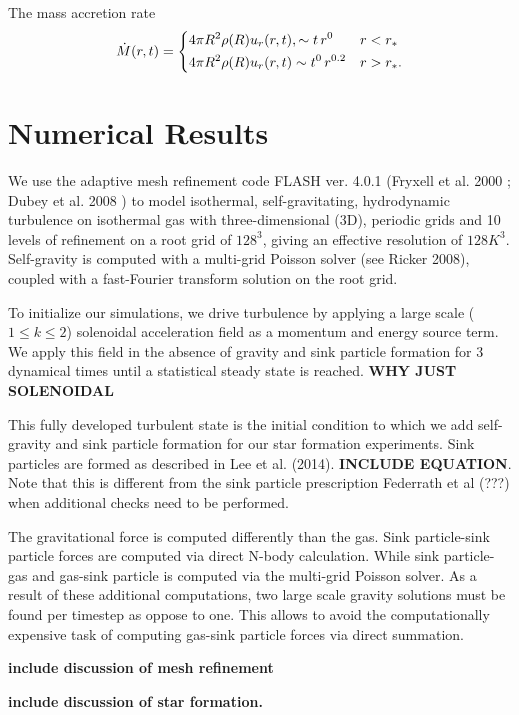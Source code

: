 \documentclass{emulateapj}
\newcommand{\be}{\begin{equation}}
\newcommand{\ee}{\end{equation}}
\begin{document}
The mass accretion rate 
%
\be
\dot M(r,t)=
\begin{dcases}
4\pi R^2\rho(R)u_r(r,t), \sim t\,r^{0} & r<r_*\\
4\pi R^2\rho(R)u_r(r,t) \sim t^0\,r^{0.2} & r>r_*.
\end{dcases}
\ee
%


\section{Numerical Results}

We use the adaptive mesh refinement code FLASH ver. 4.0.1 (Fryxell et al.
2000
; Dubey
et al.
2008
) to model isothermal, self-gravitating, hydrodynamic turbulence on isothermal gas with three-dimensional (3D),
periodic grids and 10 levels of refinement on a root grid of $128^3$, giving an effective resolution of $128K^3$.  
Self-gravity is computed with a multi-grid Poisson solver (see Ricker
2008), coupled with a fast-Fourier transform solution on the root grid.

To initialize our simulations, we drive turbulence by applying a large scale ($1 \le k \le 2$) solenoidal 
acceleration field as a momentum and energy source term.  We apply this field in the absence of gravity and sink particle formation for 3 dynamical times until a statistical steady state is reached.
{\bf WHY JUST SOLENOIDAL}

This fully developed turbulent state is the initial condition to which we add self-gravity and sink particle formation for
our star formation experiments. Sink particles are formed as described in Lee et al. (2014). {\bf INCLUDE EQUATION}.  Note that this is different from the sink particle prescription Federrath et al (???) when additional checks need to be performed.

The gravitational force is computed differently than the gas. Sink particle-sink particle forces are computed via direct N-body calculation. While sink particle-gas and gas-sink particle is computed via the multi-grid Poisson solver.  As a result of these additional computations, two large scale gravity solutions must be found per timestep as oppose to one.  This allows to avoid the computationally expensive task of computing gas-sink particle forces via direct summation. 

{\bf include discussion of mesh refinement}

{\bf include discussion of star formation.}
\end{document}

